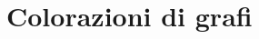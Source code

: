 \documentclass[\main/main.tex]{subfiles}
\begin{document}
\chapter{Colorazioni di grafi}

\end{document}
